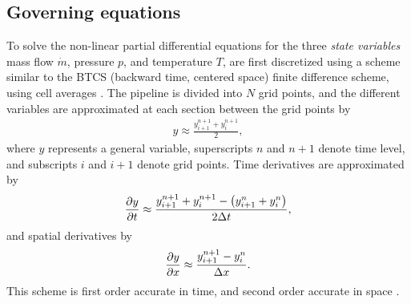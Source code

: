 \subsection{Governing equations}
\label{subsec:governingNumerical}
To solve the non-linear partial differential equations for the three \emph{state variables} mass flow $\dot m$, pressure $p$, and temperature $T$,  are first discretized using a scheme similar to the BTCS (backward time, centered space) finite difference scheme, using cell averages \cite{Kiuchi1993Implicit,Abbaspour2004Dynamic}. The pipeline is divided into $N$ grid points, and the different variables are approximated at each section between the grid points by
\begin{align}
    y \approx \frac{y^{n+1}_{i+1} + y^{n+1}_{i}}{2}
, \label{eq:variablesScheme}
\end{align}
where $y$ represents a general variable, superscripts $n$ and $n+1$ denote time level, and subscripts $i$ and $i+1$ denote grid points. Time derivatives are approximated by
\begin{align}
    \pdt{y} \approx 
    \frac{y^{n+1}_{i+1} + y^{n+1}_{i} - \del{y^{n}_{i+1} + y^{n}_{i}}}{2\Delta t}
, \label{eq:timeScheme}
\end{align}
and spatial derivatives by
\begin{align}
    \pdx{y} \approx
    \frac{y^{n+1}_{i+1} - y^{n}_{i}}{\Delta x}
. \label{eq:spatialScheme}
\end{align}
This scheme is first order accurate in time, and second order accurate in space \cite{Kiuchi1993Implicit}.

